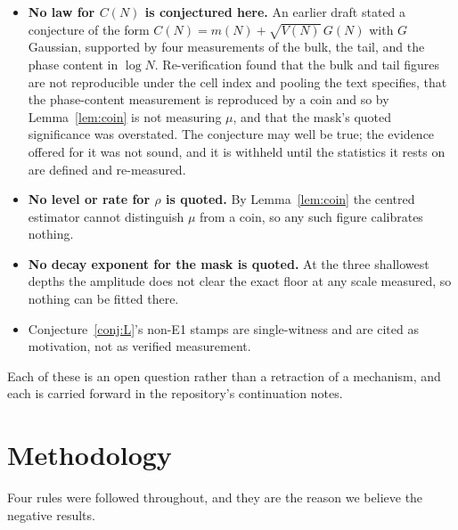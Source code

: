 \documentclass[11pt,a4paper]{article}
\theoremstyle{plain}
\theoremstyle{definition}
\begin{document}
\begin{itemize}
\item \textbf{No law for $C(N)$ is conjectured here.} An earlier draft
  stated a conjecture of the form
  $C(N) = m(N) + \sqrt{V(N)}\,G(N)$ with $G$ Gaussian, supported by
  four measurements of the bulk, the tail, and the phase content in
  $\log N$. Re-verification found that the bulk and tail figures are
  not reproducible under the cell index and pooling the text specifies,
  that the phase-content measurement is reproduced by a coin and so by
  Lemma~\ref{lem:coin} is not measuring $\mu$, and that the mask's
  quoted significance was overstated. The conjecture may well be true;
  the evidence offered for it was not sound, and it is withheld until
  the statistics it rests on are defined and re-measured.
\item \textbf{No level or rate for $\rho$ is quoted.} By
  Lemma~\ref{lem:coin} the centred estimator cannot distinguish $\mu$
  from a coin, so any such figure calibrates nothing.
\item \textbf{No decay exponent for the mask is quoted.} At the three
  shallowest depths the amplitude does not clear the exact floor at any
  scale measured, so nothing can be fitted there.
\item Conjecture~\ref{conj:L}'s non-E1 stamps are single-witness and are
  cited as motivation, not as verified measurement.
\end{itemize}

Each of these is an open question rather than a retraction of a
mechanism, and each is carried forward in the repository's continuation
notes.

\section{Methodology}

Four rules were followed throughout, and they are the reason we believe
the negative results.
\end{document}
